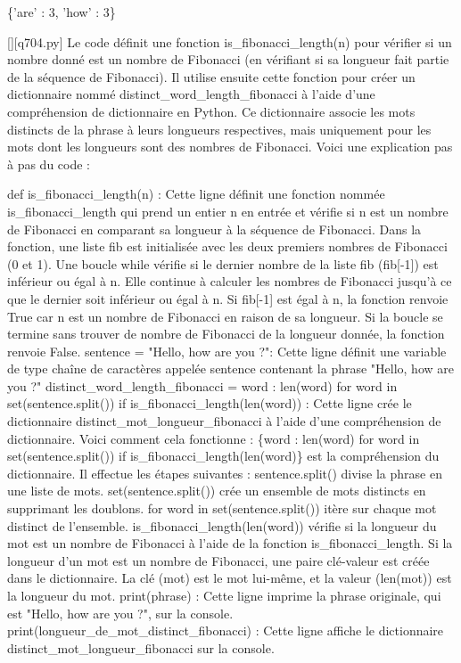 \{'are' : 3, 'how' : 3\}
        \par
        \begin{solution}
            \renewcommand{\nomfichier}{q704.py}
            \pythonfile{\chemincode \nomfichier}[][\nomfichier]
            Le code définit une fonction is\_fibonacci\_length(n) pour vérifier si un nombre donné est un nombre de Fibonacci (en vérifiant si sa longueur fait partie de la séquence de Fibonacci). Il utilise ensuite cette fonction pour créer un dictionnaire nommé distinct\_word\_length\_fibonacci à l'aide d'une compréhension de dictionnaire en Python. Ce dictionnaire associe les mots distincts de la phrase à leurs longueurs respectives, mais uniquement pour les mots dont les longueurs sont des nombres de Fibonacci. Voici une explication pas à pas du code :

    def is\_fibonacci\_length(n) : Cette ligne définit une fonction nommée is\_fibonacci\_length qui prend un entier n en entrée et vérifie si n est un nombre de Fibonacci en comparant sa longueur à la séquence de Fibonacci.
        Dans la fonction, une liste fib est initialisée avec les deux premiers nombres de Fibonacci (0 et 1).
        Une boucle while vérifie si le dernier nombre de la liste fib (fib[-1]) est inférieur ou égal à n. Elle continue à calculer les nombres de Fibonacci jusqu'à ce que le dernier soit inférieur ou égal à n.
        Si fib[-1] est égal à n, la fonction renvoie True car n est un nombre de Fibonacci en raison de sa longueur.
        Si la boucle se termine sans trouver de nombre de Fibonacci de la longueur donnée, la fonction renvoie False.
    sentence = "Hello, how are you ?": Cette ligne définit une variable de type chaîne de caractères appelée sentence contenant la phrase "Hello, how are you ?"
    distinct\_word\_length\_fibonacci = {word : len(word) for word in set(sentence.split()) if is\_fibonacci\_length(len(word))} : Cette ligne crée le dictionnaire distinct\_mot\_longueur\_fibonacci à l'aide d'une compréhension de dictionnaire. Voici comment cela fonctionne :
        \{word : len(word) for word in set(sentence.split()) if is\_fibonacci\_length(len(word)\} est la compréhension du dictionnaire. Il effectue les étapes suivantes :
        sentence.split() divise la phrase en une liste de mots.
        set(sentence.split()) crée un ensemble de mots distincts en supprimant les doublons.
        for word in set(sentence.split()) itère sur chaque mot distinct de l'ensemble.
        is\_fibonacci\_length(len(word)) vérifie si la longueur du mot est un nombre de Fibonacci à l'aide de la fonction is\_fibonacci\_length.
        Si la longueur d'un mot est un nombre de Fibonacci, une paire clé-valeur est créée dans le dictionnaire. La clé (mot) est le mot lui-même, et la valeur (len(mot)) est la longueur du mot.
    print(phrase) : Cette ligne imprime la phrase originale, qui est "Hello, how are you ?", sur la console.
    print(longueur\_de\_mot\_distinct\_fibonacci) : Cette ligne affiche le dictionnaire distinct\_mot\_longueur\_fibonacci sur la console.
        \end{solution}
        

